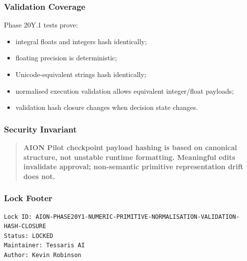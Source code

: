 \subsubsection{Validation Coverage}

Phase 20Y.1 tests prove:

\begin{itemize}
  \item integral floats and integers hash identically;
  \item floating precision is deterministic;
  \item Unicode-equivalent strings hash identically;
  \item normalised execution validation allows equivalent integer/float payloads;
  \item validation hash closure changes when decision state changes.
\end{itemize}

\subsubsection{Security Invariant}

\begin{quote}
\textbf{AION Pilot checkpoint payload hashing is based on canonical structure, not unstable runtime formatting. Meaningful edits invalidate approval; non-semantic primitive representation drift does not.}
\end{quote}

\subsubsection{Lock Footer}

\begin{verbatim}
Lock ID: AION-PHASE20Y1-NUMERIC-PRIMITIVE-NORMALISATION-VALIDATION-HASH-CLOSURE
Status: LOCKED
Maintainer: Tessaris AI
Author: Kevin Robinson
\end{verbatim}

